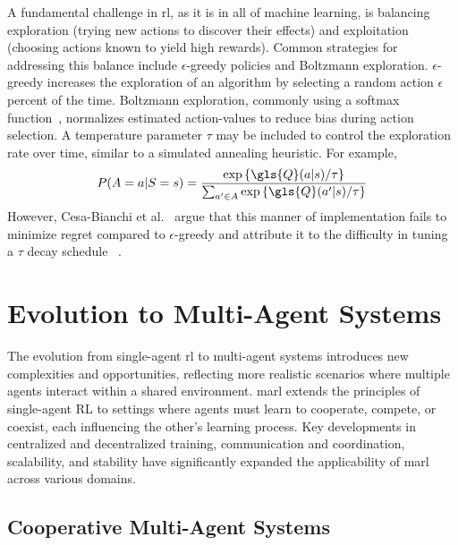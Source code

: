 A fundamental challenge in \gls{rl}, as it is in all of machine learning, 
is balancing exploration (trying new actions to discover their effects) 
and exploitation (choosing actions known to yield high rewards). 
Common strategies for addressing this balance include \(\epsilon\)-greedy 
policies and Boltzmann exploration.
\(\epsilon\)-greedy increases the exploration of an algorithm by selecting
a random action \(\epsilon\) percent of the time.
%
Boltzmann exploration, commonly using a softmax function~\cite{pan2021}, 
normalizes estimated action-values to reduce bias during action selection. 
A temperature parameter \(\tau\) may be included to control the exploration 
rate over time, similar to a simulated annealing heuristic. 
For example,
%
\begin{equation}
    P(A=a|S=s) =
    \frac{\exp\left\{\gls{Q}(a|s)/\tau\right\}}{
        \sum_{a^\prime\in A}\exp\left\{\gls{Q}(a^\prime|s)/\tau\right\}}
    \label{eq:softmax_action-value}
\end{equation}
However, Cesa-Bianchi et al.~\cite{cesa-bianchi2017} argue that this manner 
of implementation fails to minimize regret compared to \(\epsilon\)-greedy 
and attribute it to the difficulty in tuning a \(\tau\) decay schedule~
\cite{kaelbling1996,vermorel2005}.


\section{Evolution to Multi-Agent Systems}%

The evolution from single-agent \gls{rl} to multi-agent systems introduces new 
complexities and opportunities, reflecting more realistic scenarios where 
multiple agents interact within a shared environment. \Gls{marl} extends the 
principles of single-agent RL to settings where agents must learn to 
cooperate, compete, or coexist, each influencing the other's learning process.
Key developments in centralized and decentralized training, communication and 
coordination, scalability, and stability have significantly expanded the 
applicability of \gls{marl} across various domains. 

    \subsection*{Cooperative Multi-Agent Systems}%

